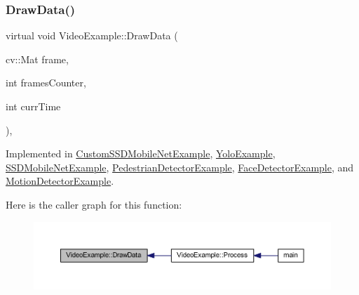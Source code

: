 \subsubsection{\texorpdfstring{Draw\+Data()}{DrawData()}}
{\footnotesize\ttfamily virtual void Video\+Example\+::\+Draw\+Data (\begin{DoxyParamCaption}\item[{cv\+::\+Mat}]{frame,  }\item[{int}]{frames\+Counter,  }\item[{int}]{curr\+Time }\end{DoxyParamCaption})\hspace{0.3cm}{\ttfamily [protected]}, {}}



Implemented in \mbox{\hyperlink{class_custom_s_s_d_mobile_net_example_a34a324a8390365c4e2c18ac049986df5}{Custom\+S\+S\+D\+Mobile\+Net\+Example}}, \mbox{\hyperlink{class_yolo_example_a1e5a542fbec653a1579ac6d5ed6dea4b}{Yolo\+Example}}, \mbox{\hyperlink{class_s_s_d_mobile_net_example_a1f011fdd15a7defb3ed518569ae5307d}{S\+S\+D\+Mobile\+Net\+Example}}, \mbox{\hyperlink{class_pedestrian_detector_example_a6fc52a844a28edd7185661b767593910}{Pedestrian\+Detector\+Example}}, \mbox{\hyperlink{class_face_detector_example_a13af0e89b24ef94ac5f5249ff387d40a}{Face\+Detector\+Example}}, and \mbox{\hyperlink{class_motion_detector_example_ad4036841b235fd67dfa45b1fc376e09c}{Motion\+Detector\+Example}}.

Here is the caller graph for this function\+:\nopagebreak
\begin{figure}[H]
\begin{center}
\leavevmode
\includegraphics[width=350pt]{class_video_example_a53eb15977cb147dac218d8ea337986cd_icgraph}
\end{center}
\end{figure}
\mbox{\label{class_video_example_a84a040bc87b915c5ee18c5d11235f40c}} 
